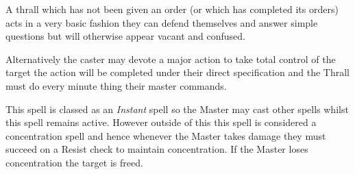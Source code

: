 \documentclass[a5paper,twocolumn, 10pt]{article}
\begin{document}
{{A thrall which has not been given an order (or which has completed its orders) acts in a very basic fashion \minus{} they can defend themselves and answer simple questions\comma{} but will otherwise appear vacant and confused. 

Alternatively\comma{} the caster may devote a major action to take total control of the target \minus{} the action will be completed under their direct specification and the Thrall must do every minute thing their master commands. 

This spell is classed as an {\it Instant} spell\comma{} so the Master may cast other spells whilst this spell remains active. However\comma{} outside of this\comma{} this spell is considered a concentration spell\comma{} and hence whenever the Master takes damage they must succeed on a Resist check to maintain concentration. If the Master loses concentration\comma{} the target is freed.
}
}
\end{document}
